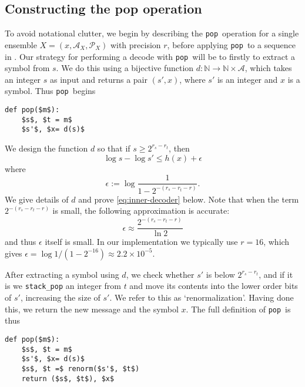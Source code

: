 \documentclass{article}
\theoremstyle{definition}
\newcommand{\pop}{\texttt{pop}}
\begin{document}
\subsection{Constructing the pop operation}
  To avoid notational clutter, we begin by describing the \pop\ operation for a
  single ensemble \(X = (x, \mathcal{A}_X, \mathcal{P}_X)\) with precision
  \(r\), before applying \pop\ to a sequence in . Our
  strategy for performing a decode with \pop\ will be to firstly to extract a
  symbol from \(s\). We do this using a bijective function \(d:\mathbb
  N\rightarrow\mathbb N\times\mathcal{A}\), which takes an integer \(s\) as
  input and returns a pair \((s', x)\), where \(s'\) is an integer and \(x\) is
  a symbol.  Thus \pop\ begins
  \begin{lstlisting}
def pop($m$):
    $s$, $t = m$
    $s'$, $x= d(s)$
  \end{lstlisting}
  We design the function \(d\) so that if \(s\geq 2^{r_s - r_t}\), then
  \begin{equation}\label{eq:inner-decoder}
    \log s - \log s' \leq h(x) + \epsilon
  \end{equation}
  where
  \begin{equation}
    \epsilon := \log \frac{1}{1 - 2^{-(r_s - r_t - r)}}.
  \end{equation}
  We give details of \(d\) and prove \cref{eq:inner-decoder} below. Note that
  when the term \(2^{-(r_s - r_t - r)}\) is small, the following approximation
  is accurate:
  \begin{equation}
    \epsilon \approx \frac{2^{-(r_s - r_t - r)}}{\ln 2}
  \end{equation}
  and thus $\epsilon$ itself is small. In our implementation we typically use
  \(r = 16\), which gives \(\epsilon = \log 1/(1 - 2^{-16}) \approx 2.2 \times
  10^{-5}\).

  After extracting a symbol using \(d\), we check whether \(s'\) is below
  \(2^{r_s - r_t}\), and if it is we \texttt{stack\_pop} an integer from \(t\)
  and move its contents into the lower order bits of \(s'\), increasing the
  size of \(s'\). We refer to this as `renormalization'. Having done this, we
  return the new message and the symbol \(x\). The full definition of \pop\ is
  thus
  \begin{lstlisting}
def pop($m$):
    $s$, $t = m$
    $s'$, $x= d(s)$
    $s$, $t =$ renorm($s'$, $t$)
    return ($s$, $t$), $x$
  \end{lstlisting}
\end{document}
